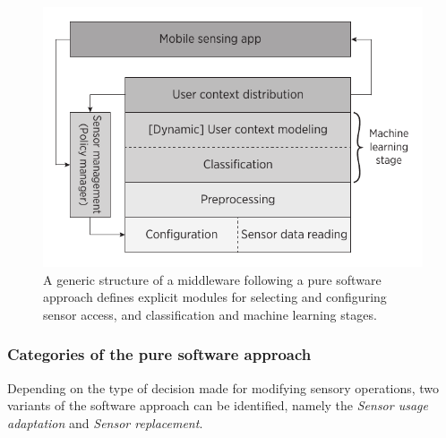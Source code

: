 \documentclass[ENG,PhD]{cinvestav}
\begin{document}
\begin{figure}
  \centering
  \includegraphics[width=0.5\columnwidth]{generic-middleware-architecture}
  \caption{A generic structure of a middleware following a pure software approach defines explicit modules for selecting and configuring sensor access, and classification and machine learning stages.}
  \label{fig:middleware-software-approach}
\end{figure}




\subsubsection{Categories of the pure software approach}
\label{sub:software-categories}
Depending on the type of decision made for modifying sensory operations, two variants of the software approach can be identified, namely the \emph{Sensor usage adaptation} and \emph{Sensor replacement}.


\end{document}
